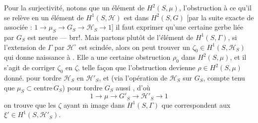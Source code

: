 Pour la surjectivité, notons que  un
élément de $H^2(S,\mu)$, l'obstruction à ce qu'il
se relève en un élément \inserted{$\zeta$} de $H^1(S,\mathcal H)$ est
dans $H^2(S,G)$ [par la suite exacte
de  associée : $1\longrightarrow\mu_S\longrightarrow G_S\longrightarrow\mathcal H_S\longrightarrow1$]
il faut exprimer qu'une certaine  gerbe
liée par $G_S$ est neutre --- brr!. Mais
partons plutôt de l'élément \inserted{\unsure{$\omega$|$\widetilde\zeta$}} de $H^1(S,\Gamma)$,
si l'extension de $\Gamma$ par $\mathcal H^\circ$ est scindée, alors
on peut trouver un $\zeta_0\in H^1(S,\mathcal H_S)$ qui
donne naissance à \unsure{$\omega$}. Elle a une certaine
obstruction $\rho_0$ dans $H^2(S,\mu)$, et il s'agit
de corriger $\zeta_0$ en $\zeta$,  telle façon que
l'obstruction devienne $\rho\in H^2(S,\mu)$ donné.
  pour tordre $\mathcal H_S$ en
$\mathcal H'_S$, et (via l'opération de $\mathcal H_S$  sur $G_S$,
compte tenu que $\mu_S\subset\mathrm{centre}\,G_S$) pour
tordre $G_S$ aussi , d'où
\[
1\longrightarrow\mu\longrightarrow G'_S\longrightarrow\mathcal H'_S\longrightarrow1
\]
on trouve que les $\zeta$ ayant $\overline{\mathrm m}$ image dans $H^1(S,\Gamma)$
que  correspondent  aux
$\xi'\in H^1(S,\mathcal H'_S)$.

